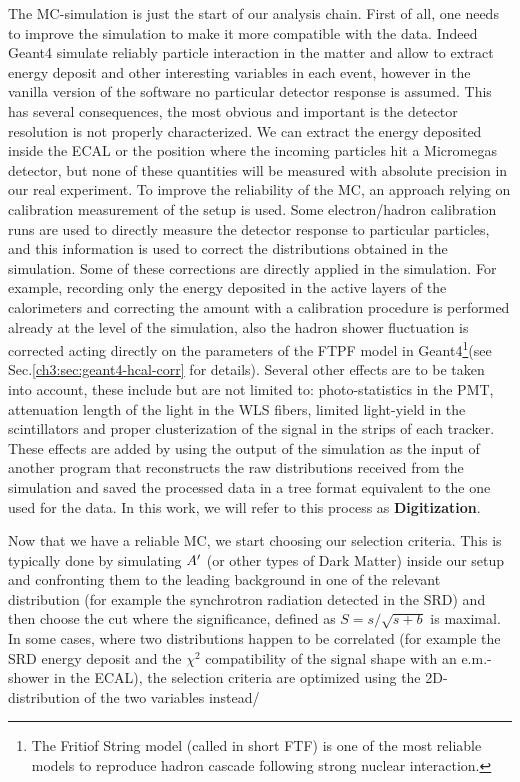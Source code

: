 The MC-simulation is just the start of our analysis chain. First of all, one needs to improve the simulation to make it more compatible with the data. Indeed Geant4 simulate reliably particle interaction in the matter and allow to extract energy deposit and other interesting variables in each event, however in the vanilla version of the software no particular detector response is assumed. This has several consequences, the most obvious and important is the detector resolution is not properly characterized. We can extract the energy deposited inside the ECAL or the position where the incoming particles hit a Micromegas detector, but none of these quantities will be measured with absolute precision in our real experiment. To improve the reliability of the MC, an approach relying on calibration measurement of the setup is used. Some electron/hadron calibration runs are used to directly measure the detector response to particular particles, and this information is used to correct the distributions obtained in the simulation. Some of these corrections are directly applied in the simulation. For example, recording only the energy deposited in the active layers of the calorimeters and correcting the amount with a calibration procedure is performed already at the level of the simulation, also the hadron shower fluctuation is corrected acting directly on the parameters of the FTPF model in Geant4\footnote{The Fritiof String model (called in short FTF) is one of the most reliable models to reproduce hadron cascade following strong nuclear interaction\cite{Uzhinsky:2013hea}.}(see Sec.\ref{ch3:sec:geant4-hcal-corr} for details). Several other effects are to be taken into account, these include but are not limited to: photo-statistics in the PMT, attenuation length of the light in the WLS fibers, limited light-yield in the scintillators and proper clusterization of the signal in the strips of each tracker. These effects are added by using the output of the simulation as the input of another program that reconstructs the raw distributions received from the simulation and saved the processed data in a tree format equivalent to the one used for the data. In this work, we will refer to this process as \textbf{Digitization}.

Now that we have a reliable MC, we start choosing our selection criteria. This is typically done by simulating $A'$ (or other types of Dark Matter) inside our setup and confronting them to the leading background in one of the relevant distribution (for example the synchrotron radiation detected in the SRD) and then choose the cut where the significance, defined as $S = s/\sqrt{s+b}$ is maximal. In some cases, where two distributions happen to be correlated (for example the SRD energy deposit and the $\chi^2$ compatibility of the signal shape with an e.m.-shower in the ECAL), the selection criteria are optimized using the 2D-distribution of the two variables instead/

